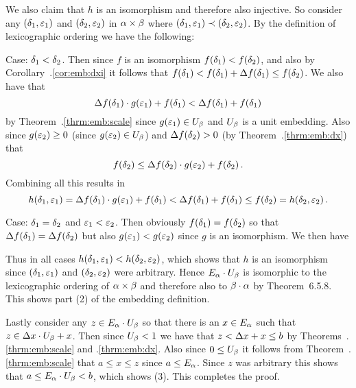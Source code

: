 \begin{solution}
{        We also claim that $h$ is an isomorphism and therefore also injective.
        So consider any $(\delta_1, \varepsilon_1)$ and $(\delta_2, \varepsilon_2)$ in $\alpha \times \beta$ where $(\delta_1, \varepsilon_1) \prec (\delta_2, \varepsilon_2)$.
        By the definition of lexicographic ordering we have the following:

        Case: $\delta_1 < \delta_2$.
        Then since $f$ is an isomorphism $f(\delta_1) < f(\delta_2)$, and also by Corollary~\ex.\ref{cor:emb:dxi} it follows that $f(\delta_1) < f(\delta_1) + \Delta f(\delta_1) \leq f(\delta_2)$.
        We also have that
        $$
        \Delta f(\delta_1) \cdot g(\varepsilon_1) + f(\delta_1) < \Delta f(\delta_1) + f(\delta_1)
        $$
        by Theorem~\ex.\ref{thrm:emb:scale} since $g(\varepsilon_1) \in U_\beta$ and $U_\beta$ is a unit embedding.
        Also since $g(\varepsilon_2) \geq 0$ (since $g(\varepsilon_2) \in U_\beta$) and $\Delta f(\delta_2) > 0$ (by Theorem~\ex.\ref{thrm:emb:dx}) that
        $$
        f(\delta_2) \leq \Delta f(\delta_2) \cdot g(\varepsilon_2) + f(\delta_2) \,.
        $$
        Combining all this results in
        $$
        h(\delta_1, \varepsilon_1) = \Delta f(\delta_1) \cdot g(\varepsilon_1) + f(\delta_1) < \Delta f(\delta_1) + f(\delta_1) \leq f(\delta_2) = h(\delta_2, \varepsilon_2) \,.
        $$

        Case: $\delta_1 = \delta_2$ and $\varepsilon_1 < \varepsilon_2$.
        Then obviously $f(\delta_1) = f(\delta_2)$ so that $\Delta f(\delta_1) = \Delta f(\delta_2)$ but also $g(\varepsilon_1) < g(\varepsilon_2)$ since $g$ is an isomorphism.
        We then have
        
        Thus in all cases $h(\delta_1, \varepsilon_1) < h(\delta_2, \varepsilon_2)$, which shows that $h$ is an isomorphism since $(\delta_1, \varepsilon_1)$ and $(\delta_2, \varepsilon_2)$ were arbitrary.
        Hence $E_\alpha \cdot U_\beta$ is isomorphic to the lexicographic ordering of $\alpha \times \beta$ and therefore also to $\beta \cdot \alpha$ by Theorem~6.5.8.
        This shows part (2) of the embedding definition.

        Lastly consider any $z \in E_\alpha \cdot U_\beta$ so that there is an $x \in E_\alpha$ such that $z \in \Delta x \cdot U_\beta + x$.
        Then since $U_\beta < 1$ we have that $z < \Delta x + x \leq b$ by Theorems~\ex.\ref{thrm:emb:scale} and \ex.\ref{thrm:emb:dx}.
        Also since $0 \leq U_\beta$ it follows from Theorem~\ex.\ref{thrm:emb:scale} that $a \leq x \leq z$ since $a \leq E_\alpha$.
        Since $z$ was arbitrary this shows that $a \leq E_\alpha \cdot U_\beta < b$, which shows (3).
        This completes the proof. \qedsymbol
    }


\end{solution}
